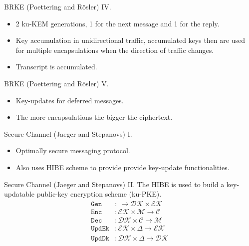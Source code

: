 \documentclass{beamer}
\begin{document}
\begin{frame}{BRKE (Poettering and Rösler) IV.}
  \scriptsize
  \begin{figure}[h]
        \centering
        \setlength{\fboxsep}{10pt}
        \scalebox{0.6}{%
        \fbox{%
          
        }
      }
    \end{figure}
    \begin{itemize}
       \item 2 ku-KEM generations, 1 for the next message and 1 for the reply.
       \item Key accumulation in unidirectional traffic, accumulated keys
         then are used for multiple encapsulations when the direction of traffic
         changes.
       \item Transcript is accumulated.
       \end{itemize}
\end{frame}

\begin{frame}{BRKE (Poettering and Rösler) V.}
  \scriptsize
    \begin{figure}[h]
        \centering
        \setlength{\fboxsep}{10pt}
        \scalebox{0.6}{%
        \fbox{%
          
        }
      }
   \end{figure}
       \begin{itemize}
       \item Key-updates for deferred messages.
       \item The more encapsulations the bigger the ciphertext.
       \end{itemize}
\end{frame}

\begin{frame}{Secure Channel (Jaeger and Stepanovs) I.}
  \begin{itemize}
  \item Optimally secure messaging protocol.
  \item Also uses HIBE scheme to provide provide key-update
    functionalities.
  \end{itemize}
\end{frame}

\begin{frame}{Secure Channel (Jaeger and Stepanovs) II.}
  The HIBE is used to build a key-updatable public-key encryption scheme (ku-PKE).
  \begin{align*}
    \texttt{Gen} & : \ \rightarrow \mathcal{DK} \times \mathcal{EK} \\
    \texttt{Enc} & : \mathcal{EK} \times \mathcal{M} \rightarrow \mathcal{C} \\
    \texttt{Dec} & : \mathcal{DK} \times \mathcal{C} \rightarrow \mathcal{M} \\
    \texttt{UpdEk} & : \mathcal{EK} \times \Delta \rightarrow \mathcal{EK} \\
    \texttt{UpdDk} & : \mathcal{DK} \times \Delta \rightarrow \mathcal{DK}
  \end{align*}
\end{frame}
\end{document}
